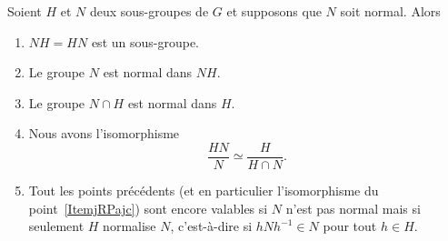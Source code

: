 \begin{theorem}
    Soient \( H\) et \( N\) deux sous-groupes de \( G\) et supposons que \( N\) soit normal. Alors
    \begin{enumerate}
        \item
            \( NH=HN\) est un sous-groupe.
        \item
            Le groupe \( N\) est normal dans \( NH\).
        \item
            Le groupe \( N\cap H\) est normal dans \( H\).

        \item\label{ItemjRPajc}
            Nous avons l'isomorphisme
            \begin{equation}
                \frac{ HN }{ N }\simeq\frac{ H }{ H\cap N }.
            \end{equation}
        \item   \label{ItembgDQEN}
            Tout les points précédents (et en particulier l'isomorphisme du point~\ref{ItemjRPajc}) sont encore valables si \( N\) n'est pas normal mais si seulement \( H\) normalise \( N\), c'est-à-dire si \( hNh^{-1}\in N\) pour tout \( h\in H\).
    \end{enumerate}
\end{theorem}

